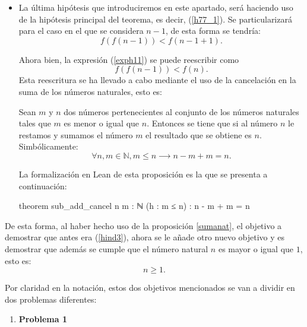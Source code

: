 \begin{demostracion}
\begin{itemize}
\begin{itemize}
      \item La última hipótesis que introduciremos en este apartado,
        será haciendo uso de la hipótesis principal del teorema,
        es decir, (\ref{h77_1}). Se particularizará para el caso en el
        que se considera \(n-1\), de esta forma se tendría:
        \begin{equation}\label{exph11}
          f(f(n-1)) < f(n-1+1).
        \end{equation}

        Ahora bien, la expresión (\ref{exph11}) se puede reescribir
        como
        \begin{equation}\label{h77_11}\tag{h11}
          f(f(n-1)) < f(n).
        \end{equation}
        Esta reescritura se ha llevado a cabo mediante el uso de
        la cancelación en la suma de los números naturales, esto es:

        \begin{proposicion}\label{sumanat}
          Sean \(m\) y \(n\) dos números pertenecientes al conjunto
          de los números naturales tales que \(m\) es menor o igual
          que \(n\). Entonces se tiene que si al número \(n\) le
          restamos y sumamos el número \(m\) el resultado que se
          obtiene es \(n\). Simbólicamente:
          \begin{equation}
            ∀ n,m ∈ ℕ, m ≤ n ⟶ n-m+m = n.
          \end{equation}
        \end{proposicion}

        La formalización en Lean de esta proposición es la que se
        presenta a continuación:
        \begin{leancode}
          theorem sub_add_cancel {n m : ℕ} (h : m ≤ n) : n - m + m = n
        \end{leancode}
      \end{itemize}

      De esta forma, al haber hecho uso de la proposición \ref{sumanat},
      el objetivo a demostrar que antes era (\ref{hind3}), ahora se le
      añade otro nuevo objetivo y es demostrar que además se cumple que
      el número natural \(n\) es mayor o igual que \(1\), esto es:
      \begin{equation}\label{n1}
        n ≥ 1.
      \end{equation}

      Por claridad en la notación, estos dos objetivos mencionados
      se van a dividir en dos problemas diferentes:
      \begin{enumerate}
      \item \textbf{Problema 1}


\end{enumerate}
\end{itemize}
\end{demostracion}
